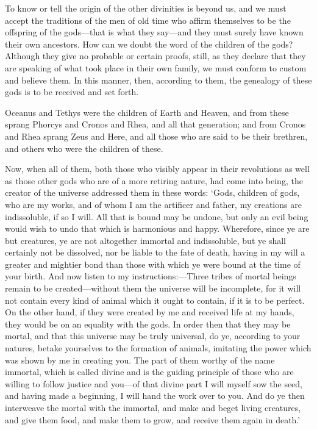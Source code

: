 \documentclass[11pt,letter]{article}
\begin{document}
\par  To know or tell the origin of the other divinities is beyond us, and we must accept the traditions of the men of old time who affirm themselves to be the offspring of the gods—that is what they say—and they must surely have known their own ancestors. How can we doubt the word of the children of the gods? Although they give no probable or certain proofs, still, as they declare that they are speaking of what took place in their own family, we must conform to custom and believe them. In this manner, then, according to them, the genealogy of these gods is to be received and set forth.

\par  Oceanus and Tethys were the children of Earth and Heaven, and from these sprang Phorcys and Cronos and Rhea, and all that generation; and from Cronos and Rhea sprang Zeus and Here, and all those who are said to be their brethren, and others who were the children of these.

\par  Now, when all of them, both those who visibly appear in their revolutions as well as those other gods who are of a more retiring nature, had come into being, the creator of the universe addressed them in these words: ‘Gods, children of gods, who are my works, and of whom I am the artificer and father, my creations are indissoluble, if so I will. All that is bound may be undone, but only an evil being would wish to undo that which is harmonious and happy. Wherefore, since ye are but creatures, ye are not altogether immortal and indissoluble, but ye shall certainly not be dissolved, nor be liable to the fate of death, having in my will a greater and mightier bond than those with which ye were bound at the time of your birth. And now listen to my instructions:—Three tribes of mortal beings remain to be created—without them the universe will be incomplete, for it will not contain every kind of animal which it ought to contain, if it is to be perfect. On the other hand, if they were created by me and received life at my hands, they would be on an equality with the gods. In order then that they may be mortal, and that this universe may be truly universal, do ye, according to your natures, betake yourselves to the formation of animals, imitating the power which was shown by me in creating you. The part of them worthy of the name immortal, which is called divine and is the guiding principle of those who are willing to follow justice and you—of that divine part I will myself sow the seed, and having made a beginning, I will hand the work over to you. And do ye then interweave the mortal with the immortal, and make and beget living creatures, and give them food, and make them to grow, and receive them again in death.’
\end{document}
